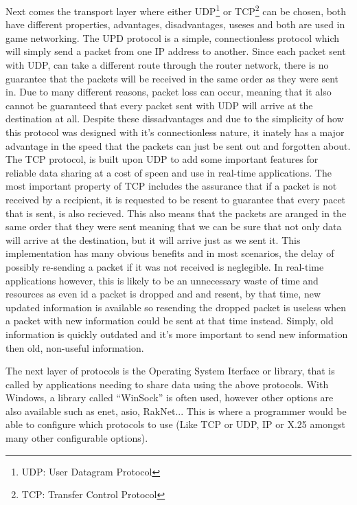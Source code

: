 Next comes the transport layer where either UDP\footnote{UDP: User Datagram Protocol} or TCP\footnote{TCP: Transfer Control Protocol}  can be chosen, both have different properties, advantages, disadvantages, useses and both are used in game networking. The UPD protocol is a simple, connectionless protocol which will simply send a packet from one IP address to another. Since each packet sent with UDP, can take a different route through the router network, there is no guarantee that the packets will be received in the same order as they were sent in. Due to many different reasons, packet loss can occur, meaning that it also cannot be guaranteed that every packet sent with UDP will arrive at the destination at all. Despite these dissadvantages and due to the simplicity of how this protocol was designed with it's connectionless nature, it inately has a major advantage in the speed that the packets can just be sent out and forgotten about. The TCP protocol, is built upon UDP to add some important features for reliable data sharing at a cost of speen and use in real-time applications. The most important property of TCP includes the assurance that if a packet is not received by a recipient, it is requested to be resent to guarantee that every pacet that is sent, is also recieved. This also means that the packets are aranged in the same order that they were sent meaning that we can be sure that not only data will arrive at the destination, but it will arrive just as we sent it. This implementation has many obvious benefits and in most scenarios, the delay of possibly re-sending a packet if it was not received is neglegible. In real-time applications however, this is likely to be an unnecessary waste of time and resources as even id a packet is dropped and and resent, by that time, new updated information is available so resending the dropped packet is useless when a packet with new information could be sent at that time instead. Simply, old information is quickly outdated and it's more important to send new information then old, non-useful information.

The next layer of protocols is the Operating System Iterface or library, that is called by applications needing to share data using the above protocols. With Windows, a library called ``WinSock'' is often used, however other options are also available such as enet, asio, RakNet... This is where a programmer would be able to configure which protocols to use (Like TCP or UDP, IP or X.25 amongst many other configurable options).


